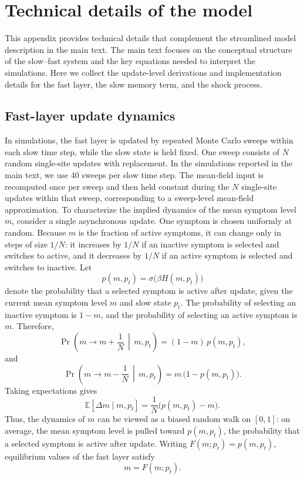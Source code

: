 \documentclass[man,12pt,floatsintext]{apa7}
\begin{document}
\section{Technical details of the model}
This appendix provides technical details that complement the streamlined model description in the main text. The main text focuses on the conceptual structure of the slow--fast system and the key equations needed to interpret the simulations. Here we collect the update-level derivations and implementation details for the fast layer, the slow memory term, and the shock process.
\subsection{Fast-layer update dynamics}
In simulations, the fast layer is updated by repeated Monte Carlo sweeps within each slow time step, while the slow state is held fixed. One sweep consists of \(N\) random single-site updates with replacement. In the simulations reported in the main text, we use 40 sweeps per slow time step. The mean-field input is recomputed once per sweep and then held constant during the \(N\) single-site updates within that sweep, corresponding to a sweep-level mean-field approximation.
To characterize the implied dynamics of the mean symptom level \(m\), consider a single asynchronous update. One symptom is chosen uniformly at random. Because \(m\) is the fraction of active symptoms, it can change only in steps of size \(1/N\): it increases by \(1/N\) if an inactive symptom is selected and switches to active, and it decreases by \(1/N\) if an active symptom is selected and switches to inactive.
Let
\[
p(m,p_t)=\sigma\!\big(\beta H(m,p_t)\big)
\]
denote the probability that a selected symptom is active after update, given the current mean symptom level \(m\) and slow state \(p_t\). The probability of selecting an inactive symptom is \(1-m\), and the probability of selecting an active symptom is \(m\). Therefore,
\[
\Pr\!\left(m\to m+\frac{1}{N}\,\middle|\,m,p_t\right)=(1-m)\,p(m,p_t),
\]
and
\[
\Pr\!\left(m\to m-\frac{1}{N}\,\middle|\,m,p_t\right)=m\,\bigl(1-p(m,p_t)\bigr).
\]
Taking expectations gives
\[
\mathbb{E}[\Delta m\mid m,p_t]
=\frac{1}{N}\bigl(p(m,p_t)-m\bigr).
\]
Thus, the dynamics of \(m\) can be viewed as a biased random walk on \([0,1]\): on average, the mean symptom level is pulled toward \(p(m,p_t)\), the probability that a selected symptom is active after update. Writing \(F(m;p_t)=p(m,p_t)\), equilibrium values of the fast layer satisfy
\[
m = F(m;p_t).
\]
\end{document}
